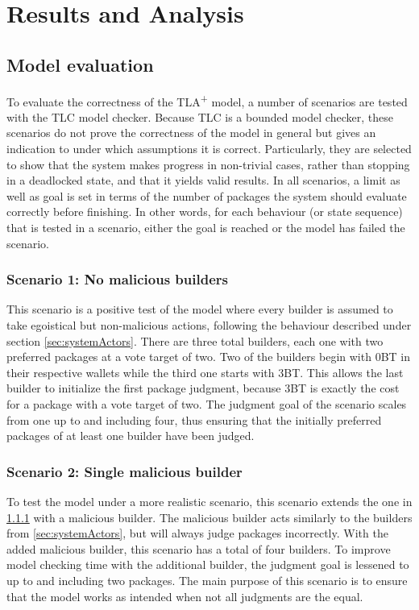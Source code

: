 \chapter{Results and Analysis}

\section{Model evaluation}

To evaluate the correctness of the TLA\textsuperscript+ model, a number of scenarios are tested with the TLC model checker. Because TLC is a bounded model checker, these scenarios do not prove the correctness of the model in general but gives an indication to under which assumptions it is correct. Particularly, they are selected to show that the system makes progress in non-trivial cases, rather than stopping in a deadlocked state, and that it yields valid results. In all scenarios, a limit as well as goal is set in terms of the number of packages the system should evaluate correctly before finishing. In other words, for each behaviour (or state sequence) that is tested in a scenario, either the goal is reached or the model has failed the scenario.

\subsection{Scenario 1: No malicious builders}
\label{subsec:scenario_non-malicious}

This scenario is a positive test of the model where every builder is assumed to take egoistical but non-malicious actions, following the behaviour described under section \ref{sec:systemActors}. There are three total builders, each one with two preferred packages at a vote target of two. Two of the builders begin with 0BT in their respective wallets while the third one starts with 3BT. This allows the last builder to initialize the first package judgment, because 3BT is exactly the cost for a package with a vote target of two. The judgment goal of the scenario scales from one up to and including four, thus ensuring that the initially preferred packages of at least one builder have been judged.

\subsection{Scenario 2: Single malicious builder}
\label{subsec:scenario_single_malicious}

To test the model under a more realistic scenario, this scenario extends the one in \ref{subsec:scenario_non-malicious} with a malicious builder. The malicious builder acts similarly to the builders from \ref{sec:systemActors}, but will always judge packages incorrectly. With the added malicious builder, this scenario has a total of four builders. To improve model checking time with the additional builder, the judgment goal is lessened to up to and including two packages. The main purpose of this scenario is to ensure that the model works as intended when not all judgments are the equal.



